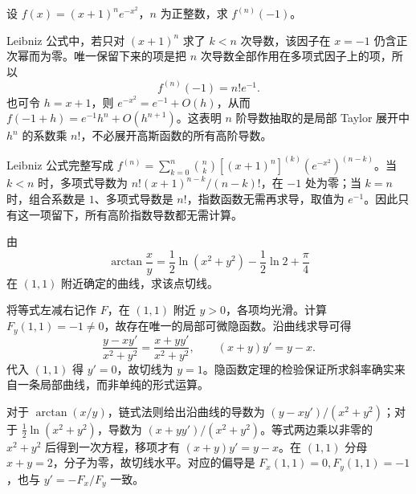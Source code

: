 \documentclass[UTF8,12pt,a4paper,fontset=fandol]{ctexart}
\begin{document}
\begin{example}\label{nm-2020-1b}
设 $f(x)=(x+1)^ne^{-x^2}$，$n$ 为正整数，求 $f^{(n)}(-1)$。
\end{example}
\begin{solve}
Leibniz 公式中，若只对 $(x+1)^n$ 求了 $k<n$ 次导数，该因子在 $x=-1$ 仍含正次幂而为零。唯一保留下来的项是把 $n$ 次导数全部作用在多项式因子上的项，所以
\[
 f^{(n)}(-1)=n!e^{-1}.
\]
也可令 $h=x+1$，则 $e^{-x^2}=e^{-1}+O(h)$，从而 $f(-1+h)=e^{-1}h^n+O(h^{n+1})$。这表明 $n$ 阶导数抽取的是局部 Taylor 展开中 $h^n$ 的系数乘 $n!$，不必展开高斯函数的所有高阶导数。

Leibniz 公式完整写成 $f^{(n)}=\sum_{k=0}^n\binom nk[(x+1)^n]^{(k)}(e^{-x^2})^{(n-k)}$。当 $k<n$ 时，多项式导数为 $n!(x+1)^{n-k}/(n-k)!$，在 $-1$ 处为零；当 $k=n$ 时，组合系数是 $1$、多项式导数是 $n!$，指数函数无需再求导，取值为 $e^{-1}$。因此只有这一项留下，所有高阶指数导数都无需计算。

\end{solve}

\begin{example}\label{nm-2020-1c}
由
\[
 \arctan\frac xy=\frac12\ln(x^2+y^2)-\frac12\ln2+\frac\pi4
\]
在 $(1,1)$ 附近确定的曲线，求该点切线。
\end{example}
\begin{solve}
将等式左减右记作 $F$，在 $(1,1)$ 附近 $y>0$，各项均光滑。计算 $F_y(1,1)=-1\ne0$，故存在唯一的局部可微隐函数。沿曲线求导可得
\[
 \frac{y-xy'}{x^2+y^2}=\frac{x+yy'}{x^2+y^2},
 \qquad (x+y)y'=y-x.
\]
代入 $(1,1)$ 得 $y'=0$，故切线为 $y=1$。隐函数定理的检验保证所求斜率确实来自一条局部曲线，而非单纯的形式运算。

对于 $\arctan(x/y)$，链式法则给出沿曲线的导数为 $(y-xy')/(x^2+y^2)$；对于 $\tfrac12\ln(x^2+y^2)$，导数为 $(x+yy')/(x^2+y^2)$。等式两边乘以非零的 $x^2+y^2$ 后得到一次方程，移项才有 $(x+y)y'=y-x$。在 $(1,1)$ 分母 $x+y=2$，分子为零，故切线水平。对应的偏导是 $F_x(1,1)=0,F_y(1,1)=-1$，也与 $y'=-F_x/F_y$ 一致。

\end{solve}
\end{document}
